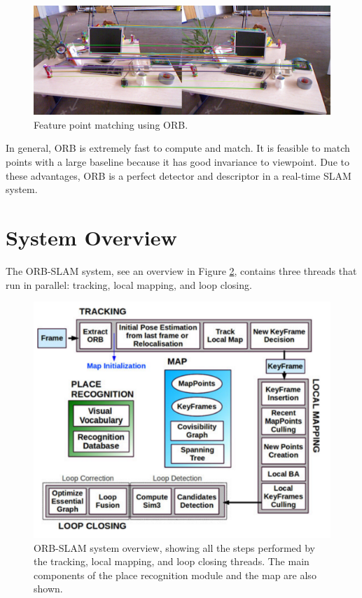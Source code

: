\documentclass[letterpaper, 10 pt, conference]{ieeeconf}  %
\begin{document}
%
\begin{figure}[!htbp]%
\centering
\includegraphics[scale=0.17]{./images/Point_correspondence}
\caption{Feature point matching using ORB. \cite{ORBextract}}
\label{point_correspondence}
\end{figure}
%

In general, ORB is extremely fast to compute and match. It is feasible to match points with a large baseline because it has good invariance to viewpoint. Due to these advantages, ORB is a perfect detector and descriptor in a real-time SLAM system. 

\section{System Overview}
\label{section3}
The ORB-SLAM system, see an overview in Figure \ref{system_overview}, contains three threads that run in parallel: tracking, local mapping, and loop closing.

\begin{figure}[!htbp]%
\centering
\includegraphics[scale=0.22]{./images/System_overview}
\caption{ORB-SLAM system overview, showing all the steps performed by the
tracking, local mapping, and loop closing threads. The main components of the
place recognition module and the map are also shown. \cite{ORBSLAM}}
\label{system_overview}
\end{figure}
\end{document}
